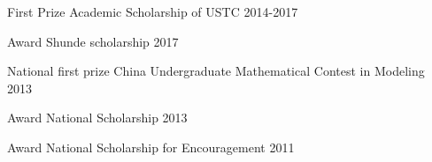 \begin{cvhonors}

  \cvhonor
    {First Prize} %
    {Academic Scholarship of USTC} %
    {} %
    {2014-2017} %
    
  \cvhonor
    {Award} %
    {Shunde scholarship} %
    {} %
    {2017} %
    
  \cvhonor
    {National first prize} %
    {China Undergraduate Mathematical Contest in Modeling} %
    {} %
    {2013} %

  \cvhonor
     {Award}
     {National Scholarship}
     {}
     {2013}

  \cvhonor
     {Award}
     {National Scholarship for Encouragement }
     {}
     {2011}


\end{cvhonors}
